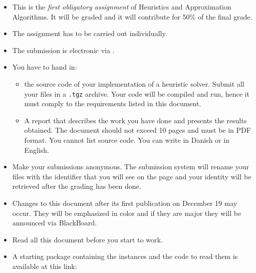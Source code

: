 
\begin{itemize}

\item This is the \emph{first obligatory assignment} of Heuristics and
  Approximation Algorithms. It will be graded and it will contribute for
  50\% of the final grade.

\item  The assignment has to be carried out individually.

\item The submission is electronic via
  .

\item  You have to hand in:
  \begin{itemize}
  \item the source code of your implementation of a heuristic
    solver. Submit all your files in a \lstinline{.tgz} archive. Your
    code will be compiled and run, hence it must comply to the
    requirements listed in this document. 
    
  \item A report that describes the work you have done and presents the
    results obtained. The document should not exceed 10 pages and must
    be in PDF format. You cannot list source code. You can write in
    Danish or in English.
  \end{itemize} 

\item Make your submissions anonymous. The submission system will rename
  your files with the identifier that you will see on the page and your
  identity will be retrieved after the grading has been done.


\item Changes to this document after its first publication on December
  19 may occur. They will be emphasized in color and if they are major
  they will be announced via BlackBoard.

\item Read all this document before you start to work.

\item A starting package containing the instances and the code to read
  them is available at this link:
\begin{center}
\end{center}
\end{itemize}




